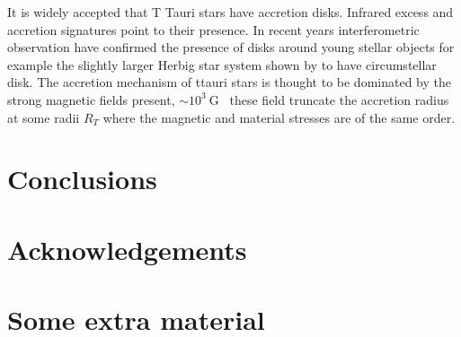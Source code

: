 \documentclass[fleqn,usenatbib]{mnras}
\begin{document}
It is widely accepted that T Tauri stars have accretion disks. Infrared excess and accretion signatures point to their presence. In recent years interferometric observation have confirmed the presence of disks around young stellar objects for example the slightly larger Herbig star system shown by \cite{2012ApJ...752...11K} to have circumstellar disk. The accretion mechanism of ttauri stars is thought to be dominated by the strong magnetic fields present, $\sim 10^{3}~\textrm{G}$~\citep{2012MNRAS.426.2901K} these field truncate the accretion radius at some radii $R_T$ where the magnetic and material stresses are of the same order.










\section{Conclusions}

\section*{Acknowledgements}









\appendix

\section{Some extra material}



\bsp	%
\label{lastpage}
\end{document}
